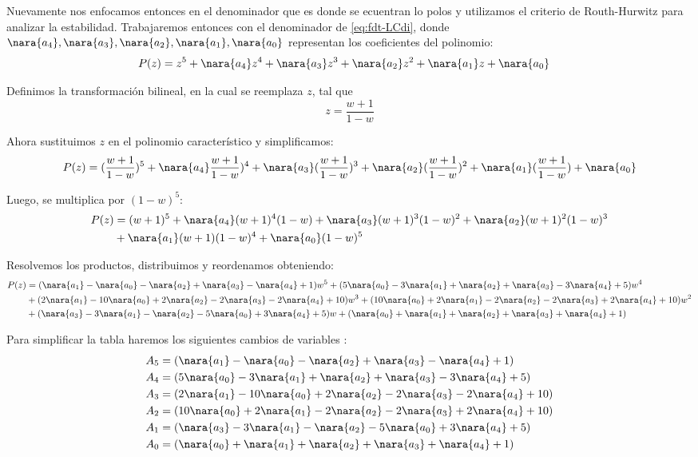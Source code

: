 Nuevamente nos enfocamos entonces en el denominador que es donde se ecuentran lo polos y
utilizamos el criterio de Routh-Hurwitz para analizar la estabilidad. 
Trabajaremos entonces con el denominador de \eqref{eq:fdt-LCdi}, donde $\nara{a_4},\nara{a_3},\nara{a_2},\nara{a_1},\nara{a_0}$
representan los coeficientes del polinomio:
\begin{align}
    P(z) = z^5+ \nara{a_4}z^4 +\nara{a_3}z^3 + \nara{a_2} z^2 + \nara{a_1} z + \nara{a_0} &
\end{align}

Definimos la transformación bilineal, en la cual se reemplaza $z$, tal que 
\begin{equation}
    z = \frac{w+1}{1-w}
\end{equation}

Ahora sustituimos $z$ en el polinomio característico y simplificamos:
\begin{equation}
    P(z) = (\frac{w+1}{1-w})^5 +\nara{a_4}\frac{w+1}{1-w})^4 + \nara{a_3}(\frac{w+1}{1-w})^3 + \nara{a_2} (\frac{w+1}{1-w})^2 + \nara{a_1} (\frac{w+1}{1-w}) + \nara{a_0}
\end{equation}

Luego, se multiplica por $(1-w)^5$:
\begin{align}
    P(z) &=  ({w+1})^5 +\nara{a_4}({w+1})^4(1-w)+ \nara{a_3}({w+1})^3(1-w)^2 + \nara{a_2} ({w+1})^2 (1-w)^3 \\
    &+ \nara{a_1} ({w+1})(1-w)^4+ \nara{a_0}(1-w)^5
\end{align}



Resolvemos los productos, distribuimos y reordenamos obteniendo:
\begin{align}
  P(z) &= (\nara{a_1} - \nara{a_0} - \nara{a_2} + \nara{a_3} - \nara{a_4} + 1) w^5 + (5\nara{a_0} - 3\nara{a_1} + \nara{a_2} + \nara{a_3} - 3\nara{a_4} + 5) w^4 \\
  &+ (2\nara{a_1} - 10\nara{a_0} + 2\nara{a_2} - 2\nara{a_3} - 2\nara{a_4} + 10) w^3 + (10\nara{a_0} + 2\nara{a_1} - 2\nara{a_2} - 2\nara{a_3} + 2\nara{a_4} + 10) w^2 \\
  &+ (\nara{a_3} - 3\nara{a_1} - \nara{a_2} - 5\nara{a_0} + 3\nara{a_4} + 5) w + (\nara{a_0} + \nara{a_1} + \nara{a_2} + \nara{a_3} + \nara{a_4} + 1)
\end{align}

Para simplificar la tabla haremos los siguientes cambios de variables :
\begin{align}
    A_5&= (\nara{a_1} - \nara{a_0} - \nara{a_2} + \nara{a_3} - \nara{a_4} + 1)\\
    A_4 &=(5\nara{a_0} - 3\nara{a_1} + \nara{a_2} + \nara{a_3} - 3\nara{a_4} + 5) \\
    A_3 &= (2\nara{a_1} - 10\nara{a_0} + 2\nara{a_2} - 2\nara{a_3} - 2\nara{a_4} + 10)\\
    A_2 &=(10\nara{a_0} + 2\nara{a_1} - 2\nara{a_2} - 2\nara{a_3} + 2\nara{a_4} + 10)\\
    A_1 &=(\nara{a_3} - 3\nara{a_1} - \nara{a_2} - 5\nara{a_0} + 3\nara{a_4} + 5)\\
    A_0 &= (\nara{a_0} + \nara{a_1} + \nara{a_2} + \nara{a_3} + \nara{a_4} + 1)
\end{align}

